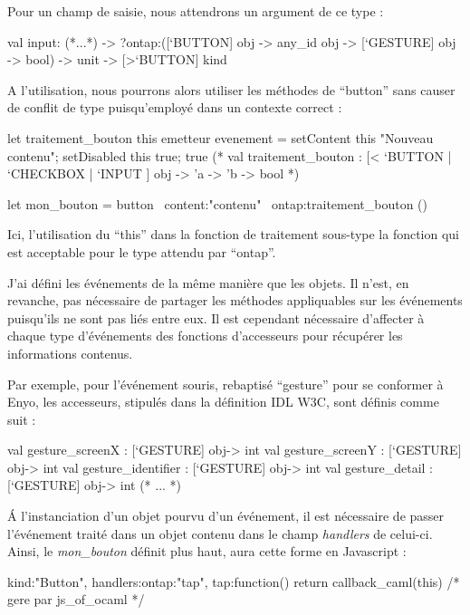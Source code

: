 \documentclass[11pt,a4paper]{report}
\begin{document}
Pour un champ de saisie, nous attendrons un argument de ce type :

\begin{OCaml}
  val input:
    (*...*)
    -> ?ontap:([`BUTTON] obj -> any_id obj -> [`GESTURE] obj -> bool)
    -> unit -> [>`BUTTON] kind
\end{OCaml}

A l'utilisation, nous pourrons alors utiliser les méthodes de ``button'' sans causer de conflit de type 
puisqu'employé dans un contexte correct :

\begin{OCaml}
let traitement_bouton this emetteur evenement = 
   setContent this "Nouveau contenu"; 
   setDisabled this true; 
   true
(*
val traitement_bouton :
  [< `BUTTON | `CHECKBOX | `INPUT ] obj -> 'a -> 'b -> bool
*)

let mon_bouton = button ~content:"contenu" ~ontap:traitement_bouton ()
\end{OCaml}

Ici, l'utilisation du ``this'' dans la fonction de traitement sous-type la fonction
qui est acceptable pour le type attendu par ``ontap''.

J'ai défini les événements de la même manière que les objets. Il n'est, en revanche, pas nécessaire 
de partager les méthodes appliquables sur les  événements puisqu'ils ne sont pas liés entre eux. Il 
est cependant nécessaire d'affecter à chaque type d'événements des fonctions d'accesseurs pour 
récupérer les informations contenus.

Par exemple, pour l'événement souris, rebaptisé ``gesture'' pour se conformer à Enyo, les accesseurs,
stipulés dans la définition IDL W3C, sont définis comme suit :

\begin{OCaml}
  val gesture_screenX : [`GESTURE] obj-> int
  val gesture_screenY : [`GESTURE] obj-> int
  val gesture_identifier : [`GESTURE] obj-> int
  val gesture_detail : [`GESTURE] obj-> int
  (* ... *)
\end{OCaml}
\medskip

\'A l'instanciation d'un objet pourvu d'un événement, il est nécessaire de passer l'événement traité
dans un objet contenu dans le champ \emph{handlers} de celui-ci. Ainsi, le \emph{mon\_bouton} définit plus haut,
aura cette forme en Javascript :

\begin{JavaScript}
  {kind:"Button", handlers:{ontap:"tap"}, 
    tap:function(){ return callback_caml(this) /* gere par js_of_ocaml */ }}
\end{JavaScript}
\end{document}
